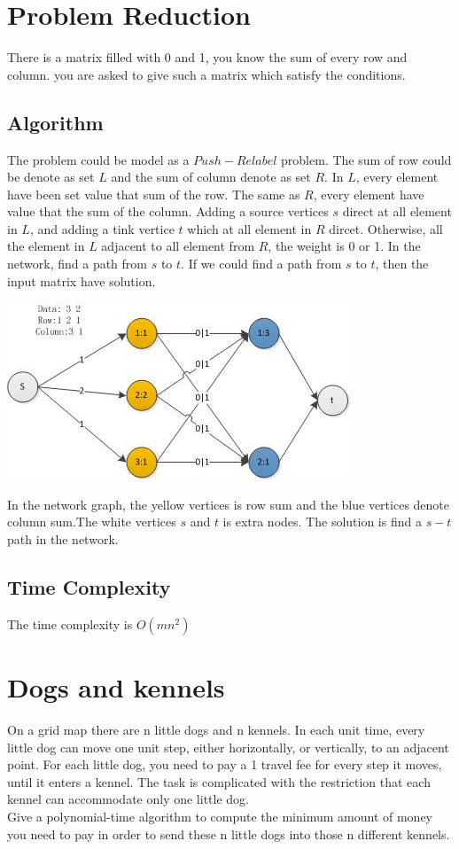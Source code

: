 \documentclass{article}
\numberwithin{equation}{section}
\begin{document}
\section{Problem Reduction}
There is a matrix filled with 0 and 1, you know the sum of every row and column. you are asked to give such a matrix which satisfy the conditions.
    \subsection{Algorithm}
    The problem could be model as a $Push-Relabel$ problem. The sum of row could be denote as set $L$
and the sum of column denote as set $R$. In $L$, every element  have been set value that sum of the row. The same as $R$, every element have value that the sum of the column. Adding a source vertices $s$ direct at all element in $L$, and adding a tink vertice $t$ which at all element in $R$ dircet. Otherwise, all the element in $L$ adjacent to all element from $R$, the weight is 0 or 1. In the network, find a path from $s$ to $t$. If we could find a path from $s$ to $t$, then the input matrix have solution.

    \begin{center}
            \includegraphics[width=0.75\columnwidth]{rowcolumn} %
    \end{center} 
    In the network graph, the yellow vertices is row sum and the blue vertices denote column sum.The white vertices $s$ and $t$ is extra nodes. The solution is find a $s - t$ path in the network.
    \subsection{Time Complexity}
    The time complexity is $O(mn^2)$
%
%

\section{Dogs and kennels}
On a grid map there are n little dogs and n kennels. In each unit time,
every little dog can move one unit step, either horizontally, or vertically, to
an adjacent point. For each little dog, you need to pay a 1 travel fee for
every step it moves, until it enters a kennel. The task is complicated with
the restriction that each kennel can accommodate only one little dog.\\
Give a polynomial-time algorithm to compute the minimum amount of
money you need to pay in order to send these n little dogs into those n
different kennels.
\end{document}
